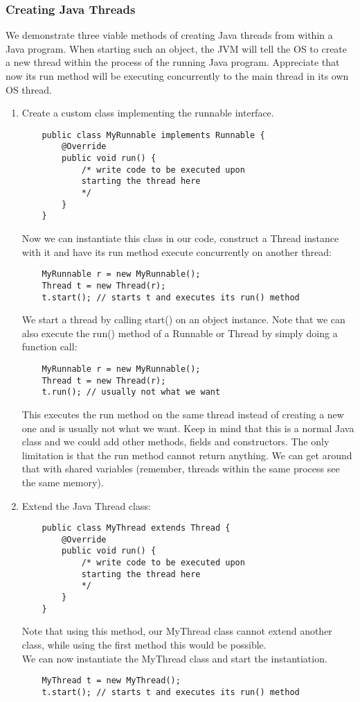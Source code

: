 \documentclass[main]{subfiles}
\begin{document}
\subsubsection{Creating Java Threads}
We demonstrate three viable methods of creating Java threads from within a Java program. When starting such an object, the JVM will tell the OS to create a new thread within the process of the running Java program. Appreciate that now its run method will be executing concurrently to the main thread in its own OS thread.
\begin{enumerate}
    \item Create a custom class implementing the runnable interface.
    \begin{verbatim}
    public class MyRunnable implements Runnable {
        @Override
        public void run() {
            /* write code to be executed upon
            starting the thread here
            */
        }
    }
    \end{verbatim}
    Now we can instantiate this class in our code, construct a Thread instance with it and have its run method execute concurrently on another thread:
    \begin{verbatim}
    MyRunnable r = new MyRunnable();
    Thread t = new Thread(r);
    t.start(); // starts t and executes its run() method
    \end{verbatim}
    We start a thread by calling start() on an object instance. Note that we can also execute the run() method of a Runnable or Thread by simply doing a function call:
    \begin{verbatim}
    MyRunnable r = new MyRunnable();
    Thread t = new Thread(r);
    t.run(); // usually not what we want
    \end{verbatim}
    This executes the run method on the same thread instead of creating a new one and is usually not what we want.
    Keep in mind that this is a normal Java class and we could add other methods, fields and constructors.
    The only limitation is that the run method cannot return anything. We can get around that with shared variables (remember, threads within the same process see the same memory).

    \item Extend the Java Thread class:
    \begin{verbatim}
    public class MyThread extends Thread {
        @Override
        public void run() {
            /* write code to be executed upon
            starting the thread here
            */
        }
    }
    \end{verbatim}
    Note that using this method, our MyThread class cannot extend another class, while using the first method this would be possible.\\
    We can now instantiate the MyThread class and start the instantiation.
    \begin{verbatim}
    MyThread t = new MyThread();
    t.start(); // starts t and executes its run() method
    \end{verbatim}


\end{enumerate}
\end{document}
